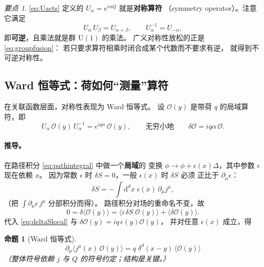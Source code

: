 \documentclass[UTF8,a4paper,11pt]{ctexart}
\theoremstyle{plain}
\newtheorem{proposition}{命题}[section]
\theoremstyle{definition}
\theoremstyle{remark}
\newtheorem{keypoint}{要点}[section]
\newcommand{\ext}{\mathrm{d}}          %
\newcommand{\Uone}{\mathrm{U}(1)}
\newcommand{\Op}{\mathcal{O}}
\newcommand{\en}[1]{\textsf{#1}}       %
\newcommand{\Uop}{U}
\begin{document}
\begin{keypoint}
\label{kp:U-operator}
\eqref{eq:Uacts} 定义的 $\Uop_\alpha=e^{i\alpha Q}$ 就是\textbf{对称算符}
（\en{symmetry operator}）。注意它满足
\begin{equation}
  \Uop_\alpha\,\Uop_\beta=\Uop_{\alpha+\beta},
  \qquad
  \Uop_\alpha^{-1}=\Uop_{-\alpha},
  \label{eq:groupfusion}
\end{equation}
即\textbf{可逆}，且乘法就是群 $\Uone$ 的乘法。
广义对称性放松的正是 \eqref{eq:groupfusion}：
若只要求算符相乘时闭合成某个代数而不要求有逆，
就得到不可逆对称性。
\end{keypoint}

\subsection{Ward 恒等式：荷如何“测量”算符}
\label{subsec:ward}

在关联函数层面，对称性表现为 Ward 恒等式。
设 $\Op(y)$ 是带荷 $q$ 的局域算符，即
\begin{equation}
  \Uop_\alpha\,\Op(y)\,\Uop_\alpha^{-1}=e^{iq\alpha}\,\Op(y),
  \qquad\text{无穷小地}\qquad
  \delta\Op=i q\alpha\,\Op .
\end{equation}

\paragraph{推导。}在路径积分 \eqref{eq:pathintegral} 中做一个\textbf{局域}的
变换 $\phi\to\phi+\epsilon(x)\Delta$，其中参数 $\epsilon$ 现在依赖 $x$。
因为常数 $\epsilon$ 时 $\delta S=0$，一般 $\epsilon(x)$ 时 $\delta S$ 必须
正比于 $\partial_\mu\epsilon$：
\begin{equation}
  \delta S=-\int \ext^dx\;\epsilon(x)\,\partial_\mu j^\mu ,
  \label{eq:deltaSlocal}
\end{equation}
（把 $\int\partial_\mu\epsilon\,j^\mu$ 分部积分而得）。
路径积分对场的重命名不变，故
\begin{equation}
  0=\delta\Big\langle \Op(y)\Big\rangle
  =\Big\langle i\,\delta S\;\Op(y)\Big\rangle
   +\Big\langle \delta\Op(y)\Big\rangle .
\end{equation}
代入 \eqref{eq:deltaSlocal} 与 $\delta\Op(y)=i q\,\epsilon(y)\Op(y)$，
并对任意 $\epsilon(x)$ 成立，得

\begin{proposition}[Ward 恒等式]
\begin{equation}
  \boxed{\
  \partial_\mu\big\langle j^\mu(x)\,\Op(y)\big\rangle
  = q\;\delta^{d}(x-y)\,\big\langle \Op(y)\big\rangle \ }
  \label{eq:ward}
\end{equation}
（整体符号依赖 $j$ 与 $Q$ 的符号约定；结构是关键。）
\end{proposition}
\end{document}
